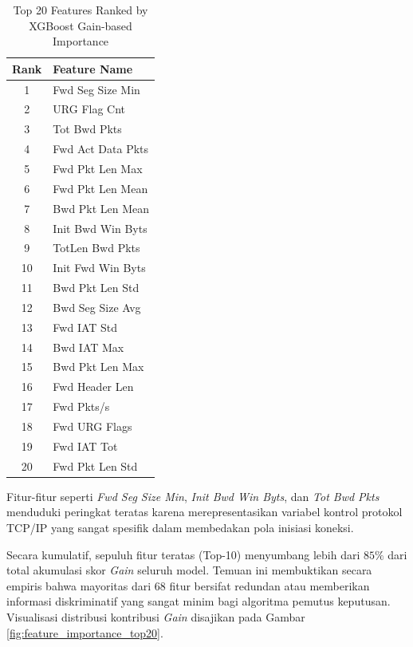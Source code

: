 \documentclass[11pt, a4paper]{article}
\begin{document}
\begin{table}[htbp]
\caption{Top 20 Features Ranked by XGBoost Gain-based Importance}
\label{tab:feature_importance}
\centering
\vspace{0.2cm}
\small
\begin{tabular}{@{}cl@{}}
\toprule
\textbf{Rank} & \textbf{Feature Name} \\ \midrule
1 & Fwd Seg Size Min \\
2 & URG Flag Cnt \\
3 & Tot Bwd Pkts \\
4 & Fwd Act Data Pkts \\
5 & Fwd Pkt Len Max \\
6 & Fwd Pkt Len Mean \\
7 & Bwd Pkt Len Mean \\
8 & Init Bwd Win Byts \\
9 & TotLen Bwd Pkts \\
10 & Init Fwd Win Byts \\ \midrule
11 & Bwd Pkt Len Std \\
12 & Bwd Seg Size Avg \\
13 & Fwd IAT Std \\
14 & Bwd IAT Max \\
15 & Bwd Pkt Len Max \\
16 & Fwd Header Len \\
17 & Fwd Pkts/s \\
18 & Fwd URG Flags \\
19 & Fwd IAT Tot \\
20 & Fwd Pkt Len Std \\ \bottomrule
\end{tabular}
\end{table}

Fitur-fitur seperti \textit{Fwd Seg Size Min}, \textit{Init Bwd Win Byts}, dan \textit{Tot Bwd Pkts} menduduki peringkat teratas karena merepresentasikan variabel kontrol protokol TCP/IP yang sangat spesifik dalam membedakan pola inisiasi koneksi.

Secara kumulatif, sepuluh fitur teratas (Top-10) menyumbang lebih dari $85\%$ dari total akumulasi skor \textit{Gain} seluruh model. Temuan ini membuktikan secara empiris bahwa mayoritas dari $68$ fitur bersifat redundan atau memberikan informasi diskriminatif yang sangat minim bagi algoritma pemutus keputusan. Visualisasi distribusi kontribusi \textit{Gain} disajikan pada Gambar \ref{fig:feature_importance_top20}.
\end{document}
